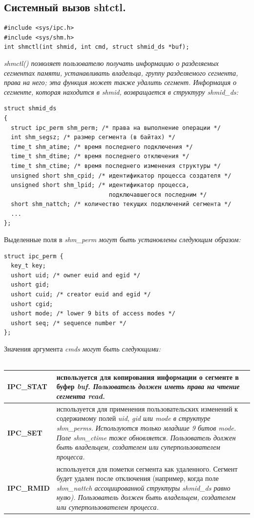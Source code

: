 \documentclass[a4paper]{article}
\begin{document}
\subsection{\Large Системный вызов shtctl.}
\begin{verbatim}
#include <sys/ipc.h>
#include <sys/shm.h>
int shmctl(int shmid, int cmd, struct shmid_ds *buf);
\end{verbatim}
\sl shmctl() \rm позволяет пользователю получать информацию о разделяемых сегментах памяти, устанавливать владельца, группу разделяемого сегмента, права на него; эта функция может также удалить сегмент. Информация о сегменте, которая находится в \sl shmid, \rm возвращается в структуру shmid\_ds:
\begin{verbatim}
struct shmid_ds 
{
  struct ipc_perm shm_perm; /* права на выполнение операции */
  int shm_segsz; /* размер сегмента (в байтах) */
  time_t shm_atime; /* время последнего подключения */
  time_t shm_dtime; /* время последнего отключения */
  time_t shm_ctime; /* время последнего изменения структуры */
  unsigned short shm_cpid; /* идентификатор процесса создателя */
  unsigned short shm_lpid; /* идентификатор процесса, 
                              подключавшегося последним */
  short shm_nattch; /* количество текущих подключений сегмента */
  ...
};
\end{verbatim}
Выделенные поля в \sl shm\_perm \rm могут быть установлены следующим образом:
\begin{verbatim}
struct ipc_perm {
  key_t key;
  ushort uid; /* owner euid and egid */
  ushort gid;
  ushort cuid; /* creator euid and egid */
  ushort cgid;
  ushort mode; /* lower 9 bits of access modes */
  ushort seq; /* sequence number */
};
\end{verbatim}
\vspace{0.5cm}
Значения аргумента \sl cmds \rm могут быть следующими:\\\\
\begin{tabular}{|p{3cm}|p{12cm}|}
  \hline
  \bf IPC\_STAT & \rm используется для копирования информации о сегменте в буфер \sl buf. \rm Пользователь должен иметь права на чтение сегмента \bf read.\rm \\
  \hline
  \bf IPC\_SET & \rm используется для применения пользовательских изменений к содержимому полей \sl uid, gid \rm или \sl mode в структуре \sl shm\_perms. \rm Используются только младшие 9 битов \sl mode. \rm Поле \sl shm\_ctime тоже обновляется. Пользователь должен быть владельцем, создателем или суперпользователем процесса. \\
  \hline
  \bf IPC\_RMID & \rm используется для пометки сегмента как удаленного. Сегмент будет удален после отключения (например, когда поле \sl shm\_nattch \rm ассоциированной структуры \sl shmid\_ds \rm равно нулю). Пользователь должен быть владельцем, создателем или суперпользователем процесса.\\
  \hline
\end{tabular}
\vspace{0.5cm}
\end{document}
